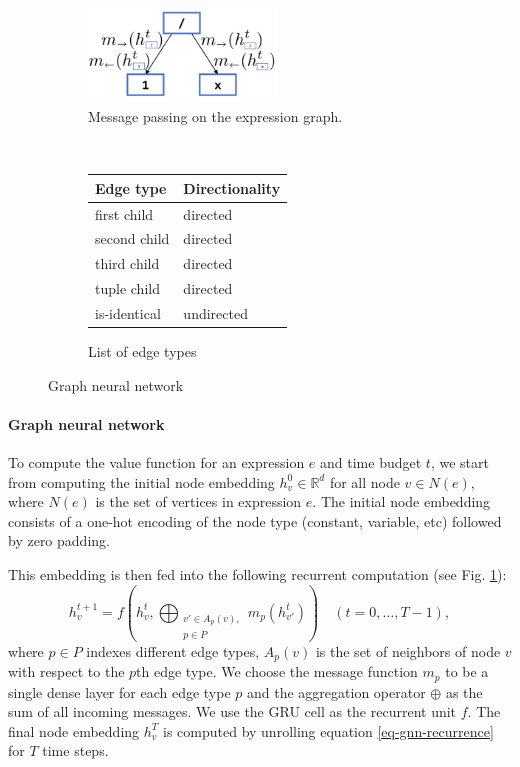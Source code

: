 \documentclass[fullpage,twocolumn]{article} %
\DeclareMathOperator*{\Oplus}{\bigoplus}
\begin{document}
\begin{figure}[t]
\begin{subfigure}[b]{.5\textwidth}
    \centering
    \includegraphics[width=5cm]{gnn_plot_larger}
    \caption{Message passing on the expression graph.}
    \label{value-function}
\end{subfigure}~\begin{subfigure}[b]{.5\textwidth}
    
    {\small\centering
    \begin{tabular}{p{1.8cm}p{1.8cm}}
    \toprule
    \bf{Edge type} & \bf{Directionality} \\ \midrule
    first child & directed \\
    second child & directed \\
    third child & directed \\
    tuple child & directed \\
    is-identical & undirected \\ \bottomrule
    \end{tabular}
    \caption{List of edge types}
    \label{tab:edge-types}
    }
\end{subfigure}
\caption{Graph neural network}
\end{figure}


\paragraph{Graph neural network}
To compute the value function for an expression $e$ and time budget $t$, we start from computing the initial node embedding $h_v^{0}\in \mathbb{R}^d$ for all node $v\in N(e)$, where $N(e)$ is the set of vertices in expression $e$. The initial node embedding consists of a one-hot encoding of the node type (constant, variable, etc) followed by zero padding.

This embedding is then fed into the following recurrent computation (see Fig. \ref{value-function}):
\begin{equation}
\label{eq-gnn-recurrence}
        \textstyle h_v^{t+1} = f\left(h_v^{t}, \Oplus_{
\substack{v'\in A_{p}(v), \\ p \in P}
}m_p\left(h_{v'}^{t}\right)\right)\quad (t=0,\ldots, T-1),
\end{equation}
where $p\in P$ indexes different edge types, $A_p(v)$ is the set of neighbors of node $v$ with respect to the $p$th edge type. We choose the message function $m_p$ to be a single dense layer for each edge type $p$ and the aggregation operator $\oplus$ as the sum of all incoming messages. We use the GRU cell \citep{cho2014learning} as the recurrent unit $f$.
%
The final node embedding $h_v^{T}$ is computed by unrolling equation \ref{eq-gnn-recurrence} for $T$ time steps.
\end{document}
